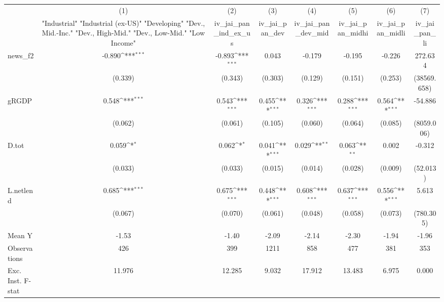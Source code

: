 {
\def\sym#1{\ifmmode^{#1}\else\(^{#1}\)\fi}
\begin{tabular}{l*{7}{c}}
\toprule
            &\multicolumn{1}{c}{(1)}&\multicolumn{1}{c}{(2)}&\multicolumn{1}{c}{(3)}&\multicolumn{1}{c}{(4)}&\multicolumn{1}{c}{(5)}&\multicolumn{1}{c}{(6)}&\multicolumn{1}{c}{(7)}\\
            &\multicolumn{1}{c}{ "Industrial" "Industrial (ex-US)" "Developing" "Dev., Mid.-Inc." "Dev., High-Mid."  "Dev., Low-Mid." "Low Income" }&\multicolumn{1}{c}{iv\_jai\_pan\_ind\_ex\_us}&\multicolumn{1}{c}{iv\_jai\_pan\_dev}&\multicolumn{1}{c}{iv\_jai\_pan\_dev\_mid}&\multicolumn{1}{c}{iv\_jai\_pan\_midhi}&\multicolumn{1}{c}{iv\_jai\_pan\_midli}&\multicolumn{1}{c}{iv\_jai\_pan\_li}\\
\midrule
news\_f2     &      -0.890\sym{***}&      -0.893\sym{***}&       0.043         &      -0.179         &      -0.195         &      -0.226         &     272.634         \\
            &     (0.339)         &     (0.343)         &     (0.303)         &     (0.129)         &     (0.151)         &     (0.253)         & (38569.658)         \\
\addlinespace
gRGDP       &       0.548\sym{***}&       0.543\sym{***}&       0.455\sym{***}&       0.326\sym{***}&       0.288\sym{***}&       0.564\sym{***}&     -54.886         \\
            &     (0.062)         &     (0.061)         &     (0.105)         &     (0.060)         &     (0.064)         &     (0.085)         &  (8059.006)         \\
\addlinespace
D.tot       &       0.059\sym{*}  &       0.062\sym{*}  &       0.041\sym{***}&       0.029\sym{**} &       0.063\sym{**} &       0.002         &      -0.312         \\
            &     (0.033)         &     (0.033)         &     (0.015)         &     (0.014)         &     (0.028)         &     (0.009)         &    (52.013)         \\
\addlinespace
L.netlend   &       0.685\sym{***}&       0.675\sym{***}&       0.448\sym{***}&       0.608\sym{***}&       0.637\sym{***}&       0.556\sym{***}&       5.613         \\
            &     (0.067)         &     (0.070)         &     (0.061)         &     (0.048)         &     (0.058)         &     (0.073)         &   (780.305)         \\
\midrule
Mean Y      &       -1.53         &       -1.40         &       -2.09         &       -2.14         &       -2.30         &       -1.94         &       -1.96         \\
Observations&         426         &         399         &        1211         &         858         &         477         &         381         &         353         \\
Exc. Inst. F-stat&      11.976         &      12.285         &       9.032         &      17.912         &      13.483         &       6.975         &       0.000         \\
\bottomrule
\end{tabular}
}
